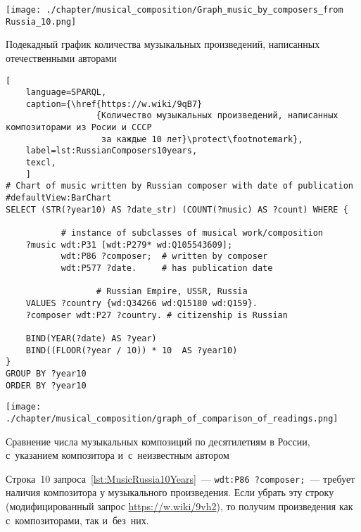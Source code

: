 \begin{marginfigure}[0\baselineskip]
	\texttt{[image: ./chapter/musical\_composition/Graph\_music\_by\_composers\_from Russia\_10.png]}
    \vspace{-7pt}
	\caption{Подекадный график количества музыкальных произведений, написанных отечественными авторами}%
	\label{fig:RussianComposers10years}%
\end{marginfigure}


\begin{lstlisting}[ 
    language=SPARQL,
    caption={\href{https://w.wiki/9qB7}
                  {Количество музыкальных произведений, написанных композиторами из Росии и СССР 
                   за каждые 10 лет}\protect\footnotemark},
    label=lst:RussianComposers10years,
    texcl,
    ]
# Chart of music written by Russian composer with date of publication
#defaultView:BarChart
SELECT (STR(?year10) AS ?date_str) (COUNT(?music) AS ?count) WHERE {
    
           # instance of subclasses of musical work/composition
    ?music wdt:P31 [wdt:P279* wd:Q105543609];
           wdt:P86 ?composer;  # written by composer
           wdt:P577 ?date.     # has publication date
    
                  # Russian Empire, USSR, Russia
    VALUES ?country {wd:Q34266 wd:Q15180 wd:Q159}.
    ?composer wdt:P27 ?country. # citizenship is Russian
  
    BIND(YEAR(?date) AS ?year)
    BIND((FLOOR(?year / 10)) * 10  AS ?year10)
}
GROUP BY ?year10
ORDER BY ?year10
\end{lstlisting}%




\newpage

\begin{marginfigure}[0\baselineskip]
	\texttt{[image: ./chapter/musical\_composition/graph\_of\_comparison\_of\_readings.png]}
	\caption{Сравнение числа музыкальных композиций по десятилетиям в России,  
             с~указанием композитора и~с~неизвестным автором}%
	\label{fig:CompareRuMusComposerWithout}%
\end{marginfigure}

Строка~10 запроса~\ref{lst:MusicRussia10Years}~---  
\lstinline|wdt:P86 ?composer;|~--- 
требует наличия композитора у музыкального произведения. 
Если убрать эту строку (модифицированный запрос \href{https://w.wiki/9vh2}
                                                     {https://w.wiki/9vh2}), 
то получим произведения как с~композиторами, так и~без~них. 


